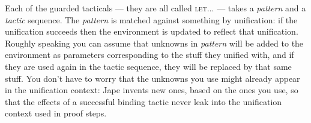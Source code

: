 Each of the guarded tacticals --- they are all called \textsc{let...} --- takes a \textit{pattern} and a \textit{tactic} sequence. The \textit{pattern} is matched against something by unification: if the unification succeeds then the environment is updated to reflect that unification. Roughly speaking you can assume that unknowns in \textit{pattern} will be added to the environment as parameters corresponding to the stuff they unified with, and if they are used again in the tactic sequence, they will be replaced by that same stuff. You don't have to worry that the unknowns you use might already appear in the unification context: Jape invents new ones, based on the ones you use, so that the effects of a successful binding tactic never leak into the unification context used in proof steps.

 